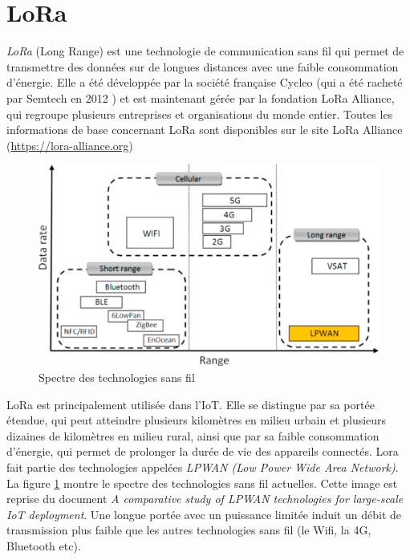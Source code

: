 \newpage

\section{LoRa}

\textit{LoRa} (Long Range) est une technologie de communication sans fil qui permet de transmettre des données sur de longues distances avec une faible consommation d'énergie. Elle a été développée par la société française Cycleo (qui a été racheté par Semtech en 2012 \cite{sitesemtech}) et est maintenant gérée par la fondation LoRa Alliance, qui regroupe plusieurs entreprises et organisations du monde entier. Toutes les informations de base concernant LoRa sont disponibles sur le site LoRa Alliance (\href{https://lora-alliance.org}{https://lora-alliance.org})

\begin{figure}[h]
\centering

\includegraphics[scale=0.5]{images/lpwan.png}
\caption{Spectre des technologies sans fil}\label{term101}
\end{figure}


LoRa est principalement utilisée dans l'IoT. Elle se distingue par sa portée étendue, qui peut atteindre plusieurs kilomètres en milieu urbain et plusieurs dizaines de kilomètres en milieu rural, ainsi que par sa faible consommation d'énergie, qui permet de prolonger la durée de vie des appareils connectés. Lora fait partie des technologies appelées \textit{LPWAN (Low Power Wide
 Area Network)}. La figure \ref{term101} montre le spectre des technologies sans fil actuelles. Cette image est reprise du document \textit{A comparative study of LPWAN technologies for large-scale IoT deployment}\cite{lpwan1}. Une longue portée avec un puissance limitée induit un débit de transmission plus faible que les autres technologies sans fil (le Wifi, la 4G, Bluetooth etc).

